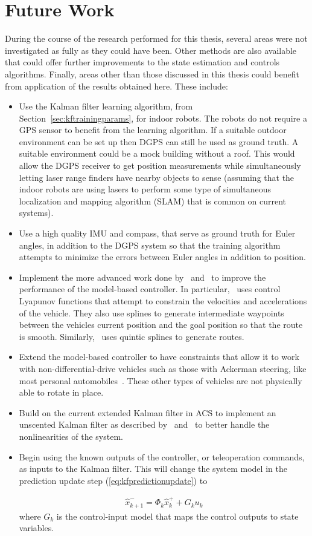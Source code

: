 \section{Future Work}%
\label{sec:futureWork}
During the course of the research performed for this thesis, several areas were not investigated as fully as they could have been.
Other methods are also available that could offer further improvements to the state estimation and controls algorithms.
Finally, areas other than those discussed in this thesis could benefit from application of the results obtained here.
These include:
\begin{itemize}
\item Use the Kalman filter learning algorithm, from Section~\ref{sec:kftrainingparams}, for indoor robots.
      The robots do not require a GPS sensor to benefit from the learning algorithm.
      If a suitable outdoor environment can be set up then DGPS can still be used as ground truth.
      A suitable environment could be a mock building without a roof.
      This would allow the DGPS receiver to get position measurements while simultaneously letting laser range finders have nearby objects to sense (assuming that the indoor robots are using lasers to perform some type of simultaneous localization and mapping algorithm (SLAM) that is common on current systems).
\item Use a high quality IMU and compass, that serve as ground truth for Euler angles, in addition to the DGPS system so that the training algorithm attempts to minimize the errors between Euler angles in addition to position.
\item Implement the more advanced work done by~\cite{Lapierre06} and~\cite{Gulati08} to improve the performance of the model-based controller.
      In particular,~\cite{Gulati08} uses control Lyapunov functions that attempt to constrain the velocities and accelerations of the vehicle.
      They also use splines to generate intermediate waypoints between the vehicles current position and the goal position so that the route is smooth.
      Similarly,~\cite{Burgard09} uses quintic splines to generate routes.
\item Extend the model-based controller to have constraints that allow it to work with non-differential-drive vehicles such as those with Ackerman steering, like most personal automobiles~\cite{Shiller91dynamicmotion}.
      These other types of vehicles are not physically able to rotate in place.
\item Build on the current extended Kalman filter in ACS to implement an unscented Kalman filter as described by~\cite{ThrunProbRobots06} and~\cite{Orderud05} to better handle the nonlinearities of the system.
\item Begin using the known outputs of the controller, or teleoperation commands, as inputs to the Kalman filter.
      This will change the system model in the prediction update step (\ref{eq:kfpredictionupdate}) to

\begin{align*}
\hat{x}_{k+1}^- = \Phi_k \hat{x}_k^+ + G_k u_k
\end{align*}
where $G_k$ is the control-input model that maps the control outputs to state variables.
\end{itemize}
